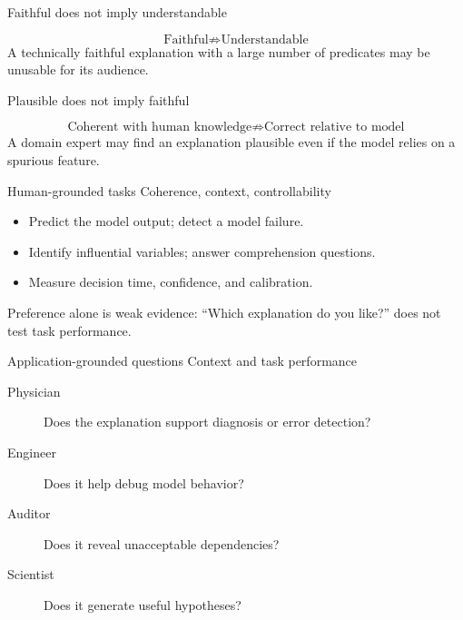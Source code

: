 \begin{frame}{Faithful does not imply understandable}
\hfill {}

\vspace{.4em}
\[
\text{Faithful}\not\Rightarrow\text{Understandable}
\]
A technically faithful explanation with a large number of predicates may be unusable for its audience.
\end{frame}

\begin{frame}{Plausible does not imply faithful}
\hfill {}

\vspace{.4em}
\[
\text{Coherent with human knowledge}\not\Rightarrow\text{Correct relative to model}
\]
A domain expert may find an explanation plausible even if the model relies on a spurious feature.
\end{frame}

\begin{frame}{Human-grounded tasks}
\hfill Coherence, context, controllability

\vspace{.4em}
\begin{itemize}
  \item Predict the model output; detect a model failure.
  \item Identify influential variables; answer comprehension questions.
  \item Measure decision time, confidence, and calibration.
\end{itemize}
Preference alone is weak evidence: ``Which explanation do you like?'' does not test task performance.
\end{frame}

\begin{frame}{Application-grounded questions}
\hfill Context and task performance

\vspace{.4em}
\begin{description}
  \item[Physician] Does the explanation support diagnosis or error detection?
  \item[Engineer] Does it help debug model behavior?
  \item[Auditor] Does it reveal unacceptable dependencies?
  \item[Scientist] Does it generate useful hypotheses?
\end{description}
\end{frame}
